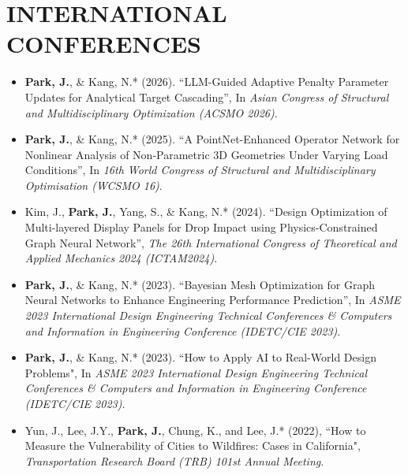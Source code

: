 \documentclass[a4paper,10pt]{article}
\begin{document}
\section*{INTERNATIONAL CONFERENCES}
\begin{itemize}[left=0pt]
    \item \textbf{Park, J.}, \& Kang, N.* (2026). “LLM-Guided Adaptive Penalty Parameter Updates for Analytical Target Cascading”, In \textit{Asian Congress of Structural and Multidisciplinary Optimization (ACSMO 2026)}.

    \item \textbf{Park, J.}, \& Kang, N.* (2025). “A PointNet-Enhanced Operator Network for Nonlinear Analysis of Non-Parametric 3D Geometries Under Varying Load Conditions”, In \textit{16th World Congress of Structural and Multidisciplinary Optimisation (WCSMO 16)}.

    \item Kim, J., \textbf{Park, J.}, Yang, S., \& Kang, N.* (2024). “Design Optimization of Multi-layered Display Panels for Drop Impact using Physics-Constrained Graph Neural Network”, \textit{The 26th International Congress of Theoretical and Applied Mechanics 2024 (ICTAM2024)}.
    
    \item \textbf{Park, J.}, \& Kang, N.* (2023). “Bayesian Mesh Optimization for Graph Neural Networks to Enhance Engineering Performance Prediction”, In \textit{ASME 2023 International Design Engineering Technical Conferences \& Computers and Information in Engineering Conference (IDETC/CIE 2023)}.
    
    \item \textbf{Park, J.}, \& Kang, N.* (2023). “How to Apply AI to Real-World Design Problems", In \textit{ASME 2023 International Design Engineering Technical Conferences \& Computers and Information in Engineering Conference (IDETC/CIE 2023)}.
    
    \item Yun, J., Lee, J.Y., \textbf{Park, J.}, Chung, K., and Lee, J.* (2022), “How to Measure the Vulnerability of Cities to Wildfires: Cases in California", \textit{Transportation Research Board (TRB) 101st Annual Meeting}.
\end{itemize}
\end{document}
